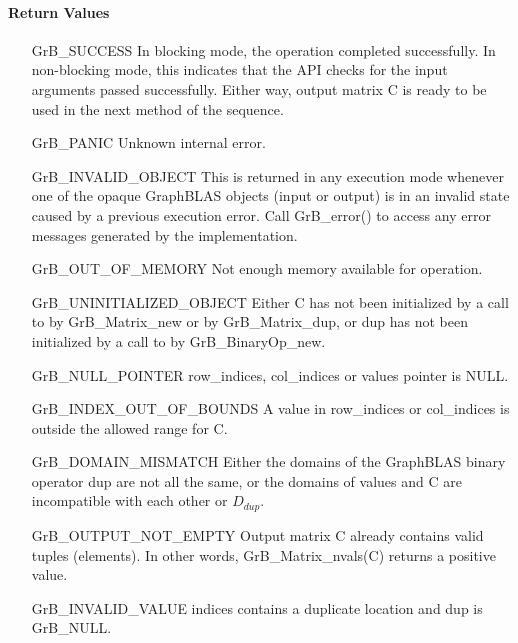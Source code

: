 \paragraph{Return Values}

\begin{itemize}[leftmargin=2.3in]
    \item[{\sf GrB\_SUCCESS}]         In blocking mode, the operation completed
    successfully. In non-blocking mode, this indicates that the API checks 
    for the input arguments passed successfully. Either way, output matrix 
    {\sf C} is ready to be used in the next method of the sequence.

    \item[{\sf GrB\_PANIC}]           Unknown internal error.
    
    \item[{\sf GrB\_INVALID\_OBJECT}] This is returned in any execution mode 
    whenever one of the opaque GraphBLAS objects (input or output) is in an invalid 
    state caused by a previous execution error.  Call {\sf GrB\_error()} to access 
    any error messages generated by the implementation.

    \item[{\sf GrB\_OUT\_OF\_MEMORY}] Not enough memory available for operation.
    
    \item[{\sf GrB\_UNINITIALIZED\_OBJECT}]  Either {\sf C} has not been 
    initialized by a call to {\sf by GrB\_Matrix\_new} or 
    {\sf by GrB\_Matrix\_dup}, or
    {\sf dup} has not been initialized by a call to {\sf by GrB\_BinaryOp\_new}.
    
    \item[{\sf GrB\_NULL\_POINTER}]  {\sf row\_indices}, 
    {\sf col\_indices} or {\sf values} pointer is {\sf NULL}.

    \item[{\sf GrB\_INDEX\_OUT\_OF\_BOUNDS}] A value in {\sf row\_indices} or
    {\sf col\_indices} is outside the allowed range for {\sf C}.

	\item[{\sf GrB\_DOMAIN\_MISMATCH}]    Either the domains of the GraphBLAS 
    binary operator {\sf dup} are not all the same, or the domains of 
    {\sf values} and {\sf C} are incompatible with each other or $D_{dup}$.
	
	\item[{\sf GrB\_OUTPUT\_NOT\_EMPTY}]    Output matrix {\sf C} already contains valid tuples (elements).
	In other words, {\sf GrB\_Matrix\_nvals(C)} returns a positive value.
    
    \item[{\sf GrB\_INVALID\_VALUE}] {\sf indices} contains a duplicate location
    and {\sf dup} is {\sf GrB\_NULL}. 
\end{itemize}

